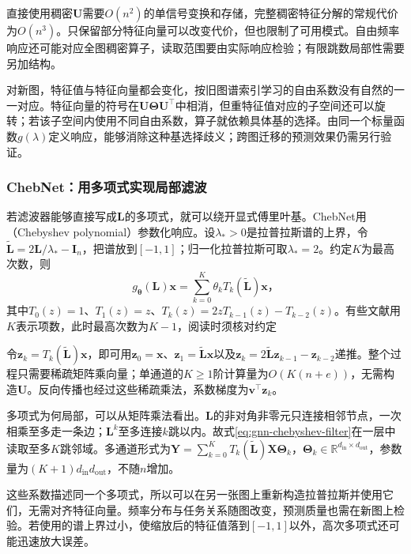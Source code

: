 直接使用稠密$\bm{U}$需要$O(n^2)$的单信号变换和存储，完整稠密特征分解的常规代价为$O(n^3)$。只保留部分特征向量可以改变代价，但也限制了可用模式。自由频率响应还可能对应全图稠密算子，读取范围要由实际响应检验；有限跳数局部性需要另加结构。

对新图，特征值与特征向量都会变化，按旧图谱索引学习的自由系数没有自然的一一对应。特征向量的符号在$\bm{U}\bm{\Theta}\bm{U}^{\top}$中相消，但重特征值对应的子空间还可以旋转；若该子空间内使用不同自由系数，算子就依赖具体基的选择。由同一个标量函数$g(\lambda)$定义响应，能够消除这种基选择歧义；跨图迁移的预测效果仍需另行验证。

\subsubsection{ChebNet：用多项式实现局部滤波}
\label{sec:gnn-chebnet}

若滤波器能够直接写成$\bm{L}$的多项式，就可以绕开显式傅里叶基。ChebNet用（Chebyshev polynomial）参数化响应。设$\lambda_*>0$是拉普拉斯谱的上界，令$\widetilde{\bm{L}}=2\bm{L}/\lambda_*-\bm{I}_n$，把谱放到$[-1,1]$；归一化拉普拉斯可取$\lambda_*=2$。约定$K$为最高次数，则
\begin{equation}
  g_{\bm{\theta}}(\bm{L})\bm{x}
    =\sum_{k=0}^{K}\theta_k T_k(\widetilde{\bm{L}})\bm{x}\text{，}
  \label{eq:gnn-chebyshev-filter}
\end{equation}
其中$T_0(z)=1$、$T_1(z)=z$、$T_k(z)=2zT_{k-1}(z)-T_{k-2}(z)$。有些文献用$K$表示项数，此时最高次数为$K-1$，阅读时须核对约定

令$\bm{z}_k=T_k(\widetilde{\bm{L}})\bm{x}$，即可用$\bm{z}_0=\bm{x}$、$\bm{z}_1=\widetilde{\bm{L}}\bm{x}$以及$\bm{z}_k=2\widetilde{\bm{L}}\bm{z}_{k-1}-\bm{z}_{k-2}$递推。整个过程只需要稀疏矩阵乘向量；单通道的$K\geq1$阶计算量为$O(K(n+e))$，无需构造$\bm{U}$。反向传播也经过这些稀疏乘法，系数梯度为$\bm{v}^{\top}\bm{z}_k$。

多项式为何局部，可以从矩阵乘法看出。$\bm{L}$的非对角非零元只连接相邻节点，一次相乘至多走一条边；$\bm{L}^k$至多连接$k$跳以内。故式\eqref{eq:gnn-chebyshev-filter}在一层中读取至多$K$跳邻域。多通道形式为$\bm{Y}=\sum_{k=0}^{K}T_k(\widetilde{\bm{L}})\bm{X}\bm{\Theta}_k$，$\bm{\Theta}_k\in\mathbb{R}^{d_{\mathrm{in}}\times d_{\mathrm{out}}}$，参数量为$(K+1)d_{\mathrm{in}}d_{\mathrm{out}}$，不随$n$增加。

这些系数描述同一个多项式，所以可以在另一张图上重新构造拉普拉斯并使用它们，无需对齐特征向量。频率分布与任务关系随图改变，预测质量也需在新图上检验。若使用的谱上界过小，使缩放后的特征值落到$[-1,1]$以外，高次多项式还可能迅速放大误差。

